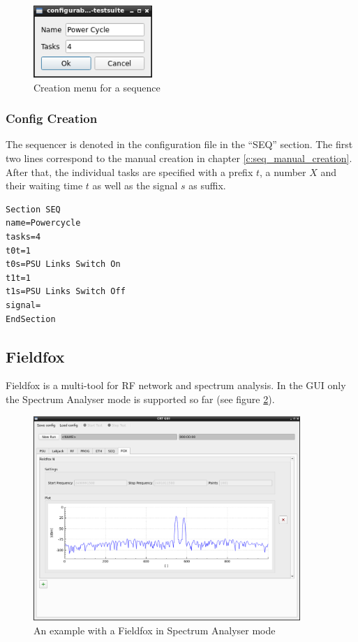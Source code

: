 \documentclass[10pt,a4paper]{article}
\begin{document}
	\begin{figure}[H]
	\centering
	\includegraphics[width=0.4\textwidth]{./9_SEQ_menu.png}
	\caption{Creation menu for a sequence}
	\label{f:seq_menu}
	\end{figure}
	
	\subsubsection{Config Creation}
	
	The sequencer is denoted in the configuration file in the \enquote{SEQ} section. The first two lines correspond to the manual creation in chapter \ref{c:seq_manual_creation}. After that, the individual tasks are specified with a prefix $t$, a number $X$ and their waiting time $t$ as well as the signal $s$ as suffix.
	
\begin{lstlisting}[caption=SEQ Config]
Section SEQ
name=Powercycle
tasks=4
t0t=1
t0s=PSU Links Switch On
t1t=1
t1s=PSU Links Switch Off
signal=
EndSection
\end{lstlisting}

\newpage
	
	\subsection{Fieldfox}
	Fieldfox is a multi-tool for RF network and spectrum analysis. In the GUI only the Spectrum Analyser mode is supported so far (see figure \ref{f:fox_example}).
	
	\begin{figure}[H]
	\centering
	\includegraphics[width=0.9\textwidth]{./10_FOX_example.png}
	\caption{An example with a Fieldfox in Spectrum Analyser mode}
	\label{f:fox_example}
	\end{figure}
	
\end{document}
